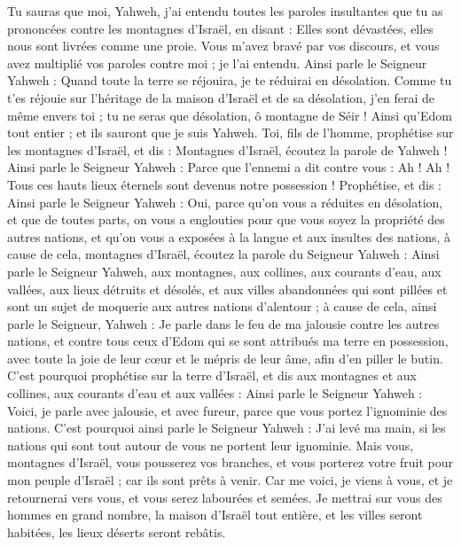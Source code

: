 \begin{multicols}{2}
Tu sauras que moi, Yahweh, j'ai entendu toutes les paroles insultantes que tu as prononcées contre les montagnes d'Israël, en disant : Elles sont dévastées, elles nous sont livrées comme une proie.
Vous m'avez bravé par vos discours, et vous avez multiplié vos paroles contre moi ; je l'ai entendu.
Ainsi parle le Seigneur Yahweh : Quand toute la terre se réjouira, je te réduirai en désolation.
Comme tu t'es réjouie sur l'héritage de la maison d'Israël et de sa désolation, j'en ferai de même envers toi ; tu ne seras que désolation, ô montagne de Séir ! Ainsi qu'Edom tout entier ; et ils sauront que je suis Yahweh.
\VerseOne{}Toi, fils de l'homme, prophétise sur les montagnes d'Israël, et dis : Montagnes d'Israël, écoutez la parole de Yahweh !
Ainsi parle le Seigneur Yahweh : Parce que l'ennemi a dit contre vous : Ah ! Ah ! Tous ces hauts lieux éternels sont devenus notre possession !
Prophétise, et dis : Ainsi parle le Seigneur Yahweh : Oui, parce qu'on vous a réduites en désolation, et que de toutes parts, on vous a englouties pour que vous soyez la propriété des autres nations, et qu'on vous a exposées à la langue et aux insultes des nations,
à cause de cela, montagnes d'Israël, écoutez la parole du Seigneur Yahweh : Ainsi parle le Seigneur Yahweh, aux montagnes, aux collines, aux courants d'eau, aux vallées, aux lieux détruits et désolés, et aux villes abandonnées qui sont pillées et sont un sujet de moquerie aux autres nations d'alentour ;
à cause de cela, ainsi parle le Seigneur, Yahweh : Je parle dans le feu de ma jalousie contre les autres nations, et contre tous ceux d'Edom qui se sont attribués ma terre en possession, avec toute la joie de leur cœur et le mépris de leur âme, afin d'en piller le butin.
C'est pourquoi prophétise sur la terre d'Israël, et dis aux montagnes et aux collines, aux courants d'eau et aux vallées : Ainsi parle le Seigneur Yahweh : Voici, je parle avec jalousie, et avec fureur, parce que vous portez l'ignominie des nations.
C'est pourquoi ainsi parle le Seigneur Yahweh : J'ai levé ma main, si les nations qui sont tout autour de vous ne portent leur ignominie.
Mais vous, montagnes d'Israël, vous pousserez vos branches, et vous porterez votre fruit pour mon peuple d'Israël ; car ils sont prêts à venir.
Car me voici, je viens à vous, et je retournerai vers vous, et vous serez labourées et semées.
Je mettrai sur vous des hommes en grand nombre, la maison d'Israël tout entière, et les villes seront habitées, les lieux déserts seront rebâtis.

\end{multicols}
